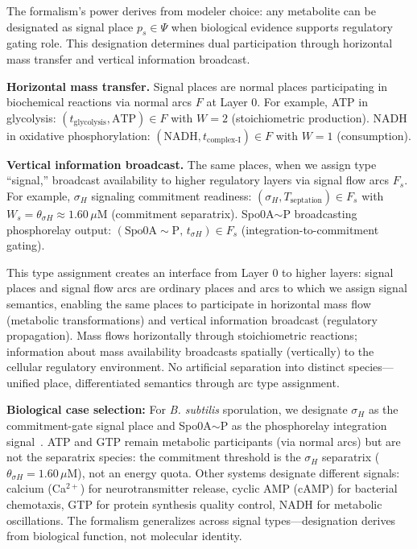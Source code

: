\documentclass[10pt,letterpaper]{article}
\begin{document}
The formalism's power derives from modeler choice: any metabolite can be designated as signal place $p_s \in \Psi$ when biological evidence supports regulatory gating role. This designation determines dual participation through horizontal mass transfer and vertical information broadcast.

\vspace{3pt}
\noindent\textbf{Horizontal mass transfer.} Signal places are normal places participating in biochemical reactions via normal arcs $F$ at Layer 0. For example, ATP in glycolysis: $(t_{\text{glycolysis}}, \text{ATP}) \in F$ with $W = 2$ (stoichiometric production). NADH in oxidative phosphorylation: $(\text{NADH}, t_{\text{complex-I}}) \in F$ with $W = 1$ (consumption).

\vspace{3pt}
\noindent\textbf{Vertical information broadcast.} The same places, when we assign type ``signal,'' broadcast availability to higher regulatory layers via signal flow arcs $F_s$. For example, $\sigma_H$ signaling commitment readiness: $(\sigma_H, T_{\text{septation}}) \in F_s$ with $W_s = \theta_{\sigma H} \approx 1.60\,\mu$M (commitment separatrix). Spo0A$\sim$P broadcasting phosphorelay output: $(\text{Spo0A}{\sim}\text{P},\, t_{\sigma H}) \in F_s$ (integration-to-commitment gating).

This type assignment creates an interface from Layer 0 to higher layers: signal places and signal flow arcs are ordinary places and arcs to which we assign signal semantics, enabling the same places to participate in horizontal mass flow (metabolic transformations) and vertical information broadcast (regulatory propagation). Mass flows horizontally through stoichiometric reactions; information about mass availability broadcasts spatially (vertically) to the cellular regulatory environment. No artificial separation into distinct species---unified place, differentiated semantics through arc type assignment.

\textbf{Biological case selection:} For \textit{B. subtilis} sporulation, we designate $\sigma_H$ as the commitment-gate signal place and Spo0A$\sim$P as the phosphorelay integration signal~\cite{fujita2005}. ATP and GTP remain metabolic participants (via normal arcs) but are not the separatrix species: the commitment threshold is the $\sigma_H$ separatrix ($\theta_{\sigma H} = 1.60\,\mu$M), not an energy quota. Other systems designate different signals: calcium (Ca$^{2+}$) for neurotransmitter release, cyclic AMP (cAMP) for bacterial chemotaxis, GTP for protein synthesis quality control, NADH for metabolic oscillations. The formalism generalizes across signal types---designation derives from biological function, not molecular identity.
\end{document}
